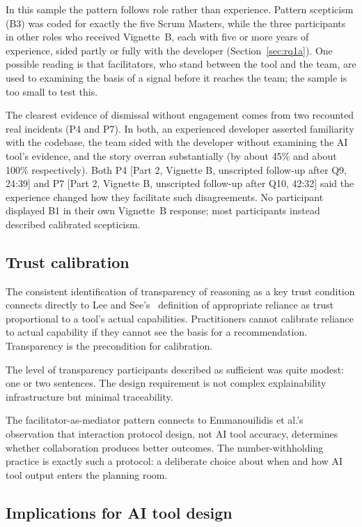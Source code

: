 \documentclass[a4paper,twoside]{bth}
\begin{document}
In this sample the pattern follows role rather than experience. Pattern scepticism (B3) was coded for exactly the five Scrum Masters, while the three participants in other roles who received Vignette~B, each with five or more years of experience, sided partly or fully with the developer (Section~\ref{sec:rq1a}). One possible reading is that facilitators, who stand between the tool and the team, are used to examining the basis of a signal before it reaches the team; the sample is too small to test this.

The clearest evidence of dismissal without engagement comes from two recounted real incidents (P4 and P7). In both, an experienced developer asserted familiarity with the codebase, the team sided with the developer without examining the AI tool's evidence, and the story overran substantially (by about 45\% and about 100\% respectively). Both P4 [Part 2, Vignette B, unscripted follow-up after Q9, 24:39] and P7 [Part 2, Vignette B, unscripted follow-up after Q10, 42:32] said the experience changed how they facilitate such disagreements. No participant displayed B1 in their own Vignette~B response; most participants instead described calibrated scepticism.

\subsection{Trust calibration}

The consistent identification of transparency of reasoning as a key trust condition connects directly to Lee and See's~\cite{lee2004trust} definition of appropriate reliance as trust proportional to a tool's actual capabilities. Practitioners cannot calibrate reliance to actual capability if they cannot see the basis for a recommendation. Transparency is the precondition for calibration.

The level of transparency participants described as sufficient was quite modest: one or two sentences. The design requirement is not complex explainability infrastructure but minimal traceability.

The facilitator-as-mediator pattern connects to Emmanouilidis et al.'s~\cite{emmanouilidis2025co} observation that interaction protocol design, not AI tool accuracy, determines whether collaboration produces better outcomes. The number-withholding practice is exactly such a protocol: a deliberate choice about when and how AI tool output enters the planning room.

\subsection{Implications for AI tool design}
\end{document}
